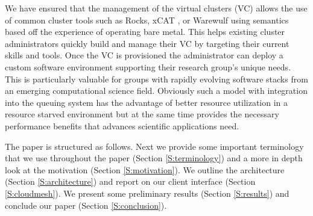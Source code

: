 We have ensured that the management of the virtual clusters (VC) allows
the use of common cluster tools such as Rocks, xCAT
\cite{www-xcat}, or Warewulf \cite{www-warewolf} using semantics based
off the experience of operating bare metal. This helps existing
cluster administrators quickly build and manage their VC by targeting
their current skills and tools. Once the VC is provisioned the
administrator can deploy a custom software environment supporting
their research group's unique needs. This is particularly valuable for
groups with rapidly evolving software stacks from an emerging
computational science field. Obviously such a model with integration
into the queuing system has the advantage of better
resource utilization in a resource starved environment but at the same
time provides the necessary performance benefits that advances
scientific applications need.

The paper is structured as follows. Next we provide some important
terminology that we use throughout the paper (Section
\ref{S:terminology}) and a more in depth look at  the motivation
(Section \ref{S:motivation}). We outline the architecture (Section
\ref{S:architecture}) and report on our client interface (Section
\ref{S:cloudmesh}). We present some preliminary results (Section
\ref{S:results}) and conclude our paper (Section \ref{S:conclusion}).
